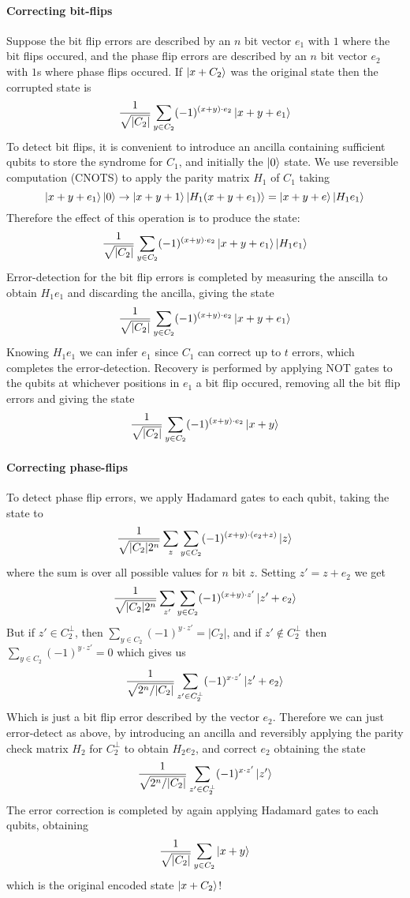 \documentclass[11pt,a4paper]{article}
\theoremstyle{definition}
\theoremstyle{plain}
\theoremstyle{remark}
\begin{document}
\paragraph{Correcting bit-flips}
Suppose the bit flip errors are described by an $n$ bit vector $e_1$ with $1$
where the bit flips occured, and the phase flip errors are described by an $n$ bit vector $e_2$ with $1$s where phase flips occured. 
If $\ket{x + C_2}$ was the original state then the corrupted state is 
$$\frac{1}{\sqrt{|C_2|}} \sum_{y \in C_2} (-1)^{(x + y) \cdot e_2} \ket{x + y + e_1}$$
To detect bit flips, it is convenient to introduce an ancilla containing sufficient qubits to store the syndrome for $C_1$, and initially the 
$\ket{0}$ state. We use reversible computation (CNOTS) to apply the parity matrix $H_1$ of $C_1$ taking 
$$\ket{x + y + e_1} \ket{0} \to \ket{x + y + 1} \ket{H_1 (x + y + e_1)} = \ket{x + y + e} \ket{H_1 e_1}$$
Therefore the effect of this operation is to produce the state: 
$$\frac{1}{\sqrt{|C_2|}} \sum_{y \in C_2} (-1)^{(x+y) \cdot e_2} \ket{x + y + e_1} \ket{H_1 e_1}$$
Error-detection for the bit flip errors is completed by measuring the anscilla to obtain $H_1 e_1$ and discarding the ancilla, giving the state 
$$\frac{1}{\sqrt{|C_2|}} \sum_{y \in C_2} (-1)^{(x+y) \cdot e_2} \ket{x + y + e_1}$$
Knowing $H_1 e_1$ we can infer $e_1$ since $C_1$ can correct up to $t$ errors, which completes the error-detection. Recovery is performed by 
applying NOT gates to the qubits at whichever positions in $e_1$ a bit flip occured, removing all the bit flip errors and giving the state
$$\frac{1}{\sqrt{|C_2|}} \sum_{y \in C_2} (-1)^{(x+y) \cdot e_2} \ket{x + y}$$

\paragraph{Correcting phase-flips}
To detect phase flip errors, we apply Hadamard gates to each qubit, taking the state to 
$$\frac{1}{\sqrt{|C_2| 2^n}} \sum_z \sum_{y \in C_2} (-1)^{(x+y) \cdot (e_2 + z)} \ket{z}$$
where the sum is over all possible values for $n$ bit $z$. Setting $z' = z + e_2$ we get 
$$\frac{1}{\sqrt{|C_2| 2^n}} \sum_{z'}\sum_{y \in C_2} (-1)^{(x+y) \cdot z'} \ket{z' + e_2}$$
But if $z' \in C_2^\perp$, then $\sum_{y \in C_2} (-1)^{y \cdot z'} = |C_2|$, and if $z' \not\in C_2^\perp$ then 
$\sum_{y \in C_2} (-1)^{y \cdot z'} = 0$ which gives us 
$$\frac{1}{\sqrt{2^n / |C_2|}} \sum_{z' \in C_2^\perp} (-1)^{x \cdot z'} \ket{z' + e_2}$$
Which is just a bit flip error described by the vector $e_2$. Therefore we can just error-detect as above, by introducing 
an ancilla and reversibly applying the parity check matrix $H_2$ for $C_2^\perp$ to obtain $H_2 e_2$, and correct $e_2$ obtaining the state
$$\frac{1}{\sqrt{2^n / |C_2|}} \sum_{z' \in C_2^\perp} (-1)^{x \cdot z'} \ket{z'}$$
The error correction is completed by again applying Hadamard gates to each qubits, obtaining 
$$\frac{1}{\sqrt{|C_2|}} \sum_{y \in C_2} \ket{x + y}$$
which is the original encoded state $\ket{x + C_2}$!
\end{document}
